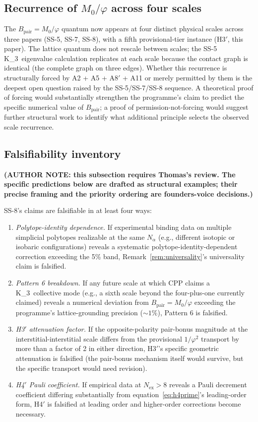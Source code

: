 \documentclass[11pt,letterpaper]{article}
\theoremstyle{definition}
\newcommand{\Mzero}{M_0}
\newcommand{\phig}{\varphi}
\newcommand{\Bpair}{B_{\text{pair}}}
\newcommand{\Nalpha}{N_\alpha}
\newcommand{\Nex}{N_{\text{ex}}}
\newcommand{\Kthree}{K_3}
\begin{document}
\subsection{Recurrence of $\Mzero/\phig$ across four scales}
\label{sec:recurrence}

The $\Bpair = \Mzero/\phig$ quantum now appears at four distinct physical scales across three papers (SS-5, SS-7, SS-8), with a fifth provisional-tier instance (H3$'$, this paper). The lattice quantum does not rescale between scales; the SS-5 \Kthree\ eigenvalue calculation replicates at each scale because the contact graph is identical (the complete graph on three edges). Whether this recurrence is structurally forced by A2 + A5 + A8$'$ + A11 or merely permitted by them is the deepest open question raised by the SS-5/SS-7/SS-8 sequence. A theoretical proof of forcing would substantially strengthen the programme's claim to predict the specific numerical value of $\Bpair$; a proof of permission-not-forcing would suggest further structural work to identify what additional principle selects the observed scale recurrence.

\subsection{Falsifiability inventory}
\label{sec:falsifiability}

\textbf{(AUTHOR NOTE: this subsection requires Thomas's review. The specific predictions below are drafted as structural examples; their precise framing and the priority ordering are founders-voice decisions.)}

SS-8's claims are falsifiable in at least four ways:

\begin{enumerate}
  \item \emph{Polytope-identity dependence.} If experimental binding data on multiple simplicial polytopes realizable at the same $\Nalpha$ (e.g., different isotopic or isobaric configurations) reveals a systematic polytope-identity-dependent correction exceeding the 5\% band, Remark~\ref{rem:universality}'s universality claim is falsified.
  \item \emph{Pattern 6 breakdown.} If any future scale at which CPP claims a \Kthree\ collective mode (e.g., a sixth scale beyond the four-plus-one currently claimed) reveals a numerical deviation from $\Bpair = \Mzero/\phig$ exceeding the programme's lattice-grounding precision ($\sim 1\%$), Pattern 6 is falsified.
  \item \emph{H3$'$ attenuation factor.} If the opposite-polarity pair-bonus magnitude at the interstitial-interstitial scale differs from the provisional $1/\phig^2$ transport by more than a factor of 2 in either direction, H3$'$'s specific geometric attenuation is falsified (the pair-bonus mechanism itself would survive, but the specific transport would need revision).
  \item \emph{H4$'$ Pauli coefficient.} If empirical data at $\Nex > 8$ reveals a Pauli decrement coefficient differing substantially from equation~\eqref{eq:h4prime}'s leading-order form, H4$'$ is falsified at leading order and higher-order corrections become necessary.
\end{enumerate}
\end{document}
